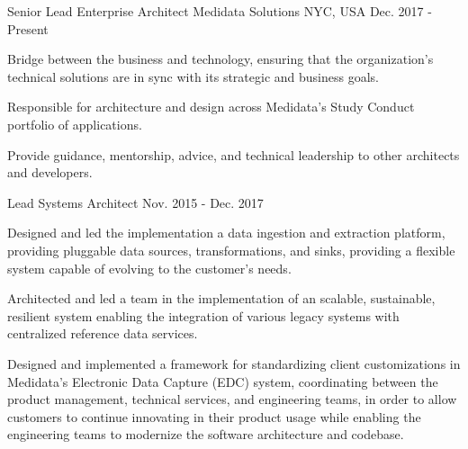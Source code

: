 

\begin{cventries}

  \cventry
    {Senior Lead Enterprise Architect} %
    {Medidata Solutions} %
    {NYC, USA} %
    {Dec. 2017 - Present} %
    {
      \begin{cvitems} %
        \item {
          Bridge between the business and technology, ensuring that the organization's technical solutions are
          in sync with its strategic and business goals.
        }
        \item {Responsible for architecture and design across Medidata's Study Conduct portfolio of applications.}
        \item {Provide guidance, mentorship, advice, and technical leadership to other architects and developers.}
      \end{cvitems}
    }
    
  \cventry
    {Lead Systems Architect}
    {}
    {}
    {Nov. 2015 - Dec. 2017}
    {
        \begin{cvitems}
          \item {
            Designed and led the implementation a data ingestion and extraction platform, providing pluggable data sources,
            transformations, and sinks, providing a flexible system capable of evolving to the customer's needs.
          }
          \item {
            Architected and led a team in the implementation of an scalable, sustainable, resilient system enabling the
            integration of various legacy systems with centralized reference data services.
          }
          \item {
            Designed and implemented a framework for standardizing client customizations in Medidata's Electronic Data
            Capture (EDC) system, coordinating between the product management, technical services, and engineering
            teams, in order to allow customers to continue innovating in their product usage while enabling
            the engineering teams to modernize the software architecture and codebase.
          }
        \end{cvitems}
    }
    

\end{cventries}
